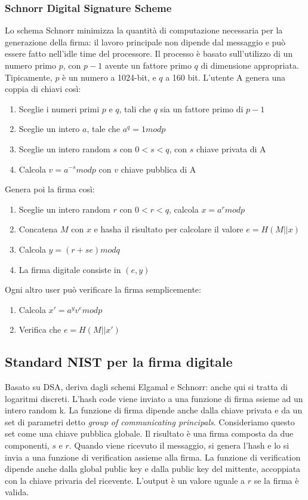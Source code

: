 \documentclass[11pt]{article}
\begin{document}
\subsubsection{Schnorr Digital Signature Scheme}
Lo schema Schnorr minimizza la quantità di computazione necessaria per la generazione della firma: il lavoro principale non dipende dal messaggio e può essere fatto nell'idle time del processore. Il processo è basato sull'utilizzo di un numero primo $p$, con $p-1$ avente un fattore primo $q$ di dimensione appropriata. Tipicamente, $p$ è un numero a 1024-bit, e $q$ a 160 bit.
L'utente A genera una coppia di chiavi così:
\begin{enumerate}
    \item Sceglie i numeri primi $p$ e $q$, tali che $q$ sia un fattore primo di $p-1$
    \item Sceglie un intero $a$, tale che $a^q= 1 mod p$
    \item Sceglie un intero random $s$ con $0<s<q$, con $s$ chiave privata di A
    \item Calcola $v=a^{-s} mod p$ con $v$ chiave pubblica di A
\end{enumerate}
Genera poi la firma così:
\begin{enumerate}
    \item Sceglie un intero random $r$ con $0<r<q$, calcola $x = a^r mod p$
    \item Concatena $M$ con $x$ e hasha il risultato per calcolare il valore $e = H(M || x)$
    \item Calcola $y = (r+se) mod q$
    \item La firma digitale consiste in $(e,y)$
\end{enumerate}
Ogni altro user può verificare la firma semplicemente:
\begin{enumerate}
    \item Calcola $x' = a^y v^e mod p$
    \item Verifica che $e=H(M || x')$
\end{enumerate}
\subsection{Standard NIST per la firma digitale}
Basato su DSA, deriva dagli schemi Elgamal e Schnorr: anche qui si tratta di logaritmi discreti. L'hash code viene inviato a una funzione di firma ssieme ad un intero random k. La funzione di firma dipende anche dalla chiave privata e da un set di parametri detto \textit{group of communicating principals}. Consideriamo questo set come una chiave pubblica globale. Il risultato è una firma composta da due componenti, $s$ e $r$. Quando viene ricevuto il messaggio, si genera l'hash e lo si invia a una funzione di verification assieme alla firma. La funzione di verification dipende anche dalla global public key e dalla public key del mittente, accoppiata con la chiave privaria del ricevente. L'output è un valore uguale a $r$ se la firma è valida. 
\end{document}
